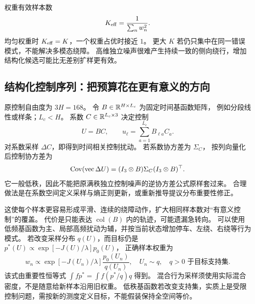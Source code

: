 权重有效样本数
\[
K_{\rm eff}=\frac1{\sum_nw_n^2}.
\]
均匀权重时 $K_{\rm eff}=K$，一个权重占优时接近 $1$。
更大 $K$ 若仍只集中在同一错误模式，不能解决多模态绕障。
高维独立噪声很难产生持续一致的侧向绕行，增加结构化候选可能比无差别扩样更有效。

\subsection{结构化控制序列：把预算花在更有意义的方向}
原控制自由度为 $3H=168$。
令 $B\in\mathbb R^{H\times L_c}$ 为固定时间基函数矩阵，
例如分段线性或样条；$L_c<H$。
系数 $C\in\mathbb R^{L_c\times3}$ 决定控制
\begin{equation}
U=BC,\qquad u_\ell=\sum_{a=1}^{L_c}B_{\ell a}C_a.
\label{eq:basis}
\end{equation}
对系数采样 $\Delta C$，即得到时间相关控制扰动。
若系数协方差为 $\Sigma_C$，
按列向量化后控制协方差为
\[
\operatorname{Cov}(\operatorname{vec}\Delta U)=
(I_3\otimes B)\Sigma_C(I_3\otimes B)^\top.
\]
它一般低秩，因此不能把原满秩独立控制噪声的逆协方差公式原样套过来。
合理做法是在系数空间定义采样与熵正则更新，或重新推导提议分布重要性修正。

这使每个样本更容易形成平滑、连续的绕障动作，扩大相同样本数对“有意义控制”的覆盖。
代价是只能表达 $\operatorname{col}(B)$ 内的轨迹，可能遗漏急转向。
可以使用低频基函数为主、局部高频扰动为辅，并按当前状态增加停车、左绕、右绕等行为模式。
若改变采样分布 $q(U)$，而目标仍是
$p^*(U)\propto\exp[-J(U)/\lambda]p_0(U)$，
正确样本权重为
\begin{equation}
w_n\propto\exp[-J(U_n)/\lambda]\frac{p_0(U_n)}{q(U_n)},
\quad U_n\sim q,\quad q>0\text{ 于目标支持集}.
\label{eq:is}
\end{equation}
该式由重要性恒等式
$\int f p^*=\int f(p^*/q)q$ 得到。
混合行为采样须使用实际混合密度，不是随意给新样本沿用旧权重。
低秩基函数若改变支持集，实质上是受限控制问题，需按新的测度定义目标，不能假装保持全空间等价。

